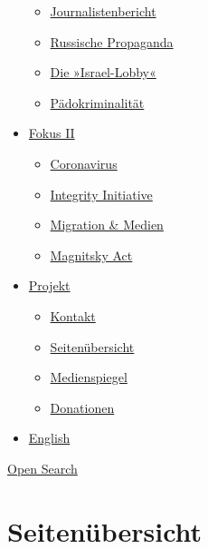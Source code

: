 \begin{itemize}
  \begin{itemize}
  \tightlist
  \item
    \href{https://swprs.org/bericht-eines-journalisten/}{Journalistenbericht}
  \item
    \href{https://swprs.org/russische-propaganda/}{Russische Propaganda}
  \item
    \href{https://swprs.org/die-israel-lobby-fakten-und-mythen/}{Die
    »Israel-Lobby«}
  \item
    \href{https://swprs.org/geopolitik-und-paedokriminalitaet/}{Pädokriminalität}
  \end{itemize}
\item
  \href{https://swprs.org/migration-und-medien/}{Fokus II}

  \begin{itemize}
  \tightlist
  \item
    \href{https://swprs.org/covid-19-hinweis-ii/}{Coronavirus}
  \item
    \href{https://swprs.org/die-integrity-initiative/}{Integrity
    Initiative}
  \item
    \href{https://swprs.org/migration-und-medien/}{Migration \& Medien}
  \item
    \href{https://swprs.org/der-fall-magnitsky/}{Magnitsky Act}
  \end{itemize}
\item
  \href{https://swprs.org/kontakt/}{Projekt}

  \begin{itemize}
  \tightlist
  \item
    \href{https://swprs.org/kontakt/}{Kontakt}
  \item
    \href{https://swprs.org/uebersicht/}{Seitenübersicht}
  \item
    \href{https://swprs.org/medienspiegel/}{Medienspiegel}
  \item
    \href{https://swprs.org/donationen/}{Donationen}
  \end{itemize}
\item
  \href{https://swprs.org/contact/}{English}
\end{itemize}

\protect\hyperlink{}{Open Search}

\hypertarget{seitenuxfcbersicht}{%
\section{Seitenübersicht}\label{seitenuxfcbersicht}}

